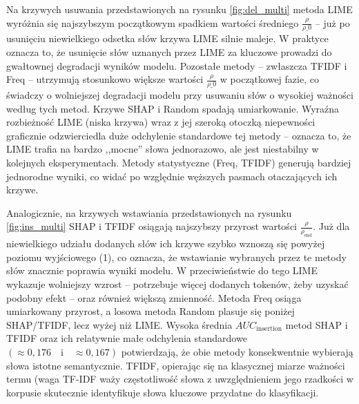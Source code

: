 \documentclass[wmii, inf, mgr]{uwmthesis}
\begin{document}
Na krzywych usuwania przedstawionych na rysunku \ref{fig:del_multi} metoda LIME wyróżnia się najszybszym początkowym spadkiem wartości średniego $\frac{\rho}{\rho\_{0}}$ -- już po usunięciu niewielkiego odsetka słów krzywa LIME silnie maleje. W praktyce oznacza to, że usunięcie słów uznanych przez LIME za kluczowe prowadzi do gwałtownej degradacji wyników modelu. Pozostałe metody -- zwłaszcza TFIDF i Freq -- utrzymują stosunkowo większe wartości $\frac{\rho}{\rho\_{0}}$ w początkowej fazie, co świadczy o wolniejszej degradacji modelu przy usuwaniu słów o wysokiej ważności według tych metod. Krzywe SHAP i Random spadają umiarkowanie. Wyraźna rozbieżność LIME (niska krzywa) wraz z jej szeroką otoczką niepewności graficznie odzwierciedla duże odchylenie standardowe tej metody -- oznacza to, że LIME trafia na bardzo ,,mocne'' słowa jednorazowo, ale jest niestabilny w kolejnych eksperymentach. Metody statystyczne (Freq, TFIDF) generują bardziej jednorodne wyniki, co widać po względnie węższych pasmach otaczających ich krzywe.

Analogicznie, na krzywych wstawiania przedstawionych na rysunku \ref{fig:ins_multi} SHAP i TFIDF osiągają najszybszy przyrost wartości $\frac{\rho}{\rho_{\text{end}}}$. Już dla niewielkiego udziału dodanych słów ich krzywe szybko wznoszą się powyżej poziomu wyjściowego (1), co oznacza, że wstawianie wybranych przez te metody słów znacznie poprawia wyniki modelu. W przeciwieństwie do tego LIME wykazuje wolniejszy wzrost -- potrzebuje więcej dodanych tokenów, żeby uzyskać podobny efekt -- oraz również większą zmienność. Metoda Freq osiąga umiarkowany przyrost, a losowa metoda Random plasuje się poniżej SHAP/TFIDF, lecz wyżej niż LIME. Wysoka średnia $AUC_{\text{insertion}}$ metod SHAP i TFIDF oraz ich relatywnie małe odchylenia standardowe $(\approx 0{,}176 \quad \text{i} \quad \approx 0{,}167)$ potwierdzają, że obie metody konsekwentnie wybierają słowa istotne semantycznie. TFIDF, opierając się na klasycznej miarze ważności termu (waga TF-IDF waży częstotliwość słowa z uwzględnieniem jego rzadkości w korpusie skutecznie identyfikuje słowa kluczowe przydatne do klasyfikacji.
\end{document}
